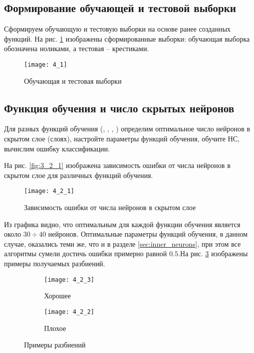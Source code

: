 \subsection{Формирование обучающей и тестовой выборки}

Сформируем обучающую и тестовую выборки на основе ранее созданных функций. На рис. \ref{fig:4_1} изображены сформированные выборки: обучающая выборка обозначена ноликами, а тестовая -- крестиками.
\begin{figure}[H]
\begin{center}
	\texttt{[image: 4\_1]}
	\caption{Обучающая и тестовая выборки}
	\label{fig:4_1}
\end{center}
\end{figure}

\subsection{Функция обучения и число скрытых нейронов}

Для разных функций обучения (, , , ) определим оптимальное число нейронов в скрытом слое (слоях), настройте параметры функций обучения, обучите НС, вычислим ошибку классификации.

На рис. \ref{fig:3_2_1} изображена зависимость ошибки от числа нейронов в скрытом слое для различных функций обучения.
\begin{figure}[H]
\begin{center}
	\texttt{[image: 4\_2\_1]}
	\caption{Зависимость ошибки от числа нейронов в скрытом слое}
	\label{fig:4_2_1}
\end{center}
\end{figure}
Из графика видно, что оптимальным для каждой функции обучения является около $30 \div 40$ нейронов. Оптимальные параметры функций обучения, в данном случае, оказались теми же, что и в разделе \ref{sec:inner_neurons}, при этом  все алгоритмы сумели достичь ошибки  примерно равной $0.5$.На рис. \ref{fig:4_2} изображены примеры получаемых разбиений.
\begin{figure}[H]
\begin{center}
	\begin{subfigure}[b]{0.49\textwidth}
		\texttt{[image: 4\_2\_3]}
		\caption{Хорошее}
	\end{subfigure}
	\begin{subfigure}[b]{0.49\textwidth}
		\texttt{[image: 4\_2\_2]}
		\caption{Плохое}
	\end{subfigure}
	\caption{Примеры разбиений}
	\label{fig:4_2}
\end{center}
\end{figure}

